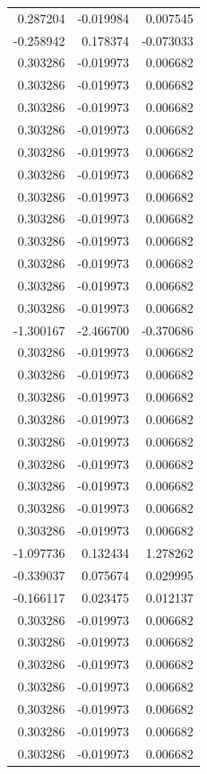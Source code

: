 \documentclass[a4paper,twoside,12pt]{book}
\begin{document}
\begin{appendices}
\begin{table}
\begin{tabular}{rrr}
	 0.287204 & -0.019984 &  0.007545 \\
	-0.258942 &  0.178374 & -0.073033 \\
	 0.303286 & -0.019973 &  0.006682 \\
	 0.303286 & -0.019973 &  0.006682 \\
	 0.303286 & -0.019973 &  0.006682 \\
	 0.303286 & -0.019973 &  0.006682 \\
	 0.303286 & -0.019973 &  0.006682 \\
	 0.303286 & -0.019973 &  0.006682 \\
	 0.303286 & -0.019973 &  0.006682 \\
	 0.303286 & -0.019973 &  0.006682 \\
	 0.303286 & -0.019973 &  0.006682 \\
	 0.303286 & -0.019973 &  0.006682 \\
	 0.303286 & -0.019973 &  0.006682 \\
	 0.303286 & -0.019973 &  0.006682 \\
	-1.300167 & -2.466700 & -0.370686 \\
	 0.303286 & -0.019973 &  0.006682 \\
	 0.303286 & -0.019973 &  0.006682 \\
	 0.303286 & -0.019973 &  0.006682 \\
	 0.303286 & -0.019973 &  0.006682 \\
	 0.303286 & -0.019973 &  0.006682 \\
	 0.303286 & -0.019973 &  0.006682 \\
	 0.303286 & -0.019973 &  0.006682 \\
	 0.303286 & -0.019973 &  0.006682 \\
	 0.303286 & -0.019973 &  0.006682 \\
	-1.097736 &  0.132434 &  1.278262 \\
	-0.339037 &  0.075674 &  0.029995 \\
	-0.166117 &  0.023475 &  0.012137 \\
	 0.303286 & -0.019973 &  0.006682 \\
	 0.303286 & -0.019973 &  0.006682 \\
	 0.303286 & -0.019973 &  0.006682 \\
	 0.303286 & -0.019973 &  0.006682 \\
	 0.303286 & -0.019973 &  0.006682 \\
	 0.303286 & -0.019973 &  0.006682 \\
	 0.303286 & -0.019973 &  0.006682 \\

\end{tabular}
\end{table}
\end{appendices}
\end{document}
